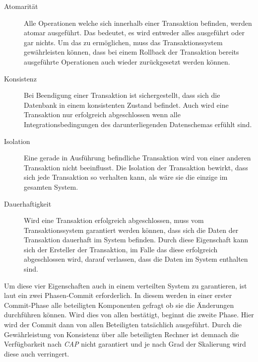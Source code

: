 \begin{description}
  \item[Atomarität] Alle Operationen welche sich innerhalb einer Transaktion befinden, werden atomar ausgeführt. Das bedeutet, es wird entweder alles ausgeführt oder gar nichts. Um das zu ermöglichen, muss das Transaktionssystem gewährleisten können, dass bei einem Rollback der Transaktion bereits ausgeführte Operationen auch wieder zurückgesetzt werden können. 
  \item[Konsistenz] Bei Beendigung einer Transaktion ist sichergestellt, dass sich die Datenbank in einem konsistenten Zustand befindet. Auch wird eine Transaktion nur erfolgreich abgeschlossen wenn alle Integrationsbedingungen des darunterliegenden Datenschemas erfühlt sind. 
  \item[Isolation] Eine gerade in Ausführung befindliche Transaktion wird von einer anderen Transaktion nicht beeinflusst. Die Isolation der Transaktion bewirkt, dass sich jede Transaktion so verhalten kann, als wäre sie die einzige im gesamten System.
  \item[Dauerhaftigkeit] Wird eine Transaktion erfolgreich abgeschlossen, muss vom Transaktionssystem garantiert werden können, dass sich die Daten der Transaktion dauerhaft im System befinden. Durch diese Eigenschaft kann sich der Ersteller der Transaktion, im Falle das diese erfolgreich abgeschlossen wird, darauf verlassen, dass die Daten im System enthalten sind.
\end{description}
Um diese vier Eigenschaften auch in einem verteilten System zu garantieren, ist laut \cite{PritchettBASE} ein zwei Phasen-Commit erforderlich. In diesem werden in einer erster Commit-Phase alle beteiligten Komponenten gefragt ob sie die Änderungen durchführen können. Wird dies von allen bestätigt, beginnt die zweite Phase. Hier wird der Commit dann von allen Beteiligten tatsächlich ausgeführt. Durch die Gewährleistung von Konsistenz über alle beteiligten Rechner ist demnach die Verfügbarkeit nach \textit{CAP} nicht garantiert und je nach Grad der Skalierung wird diese auch verringert.

